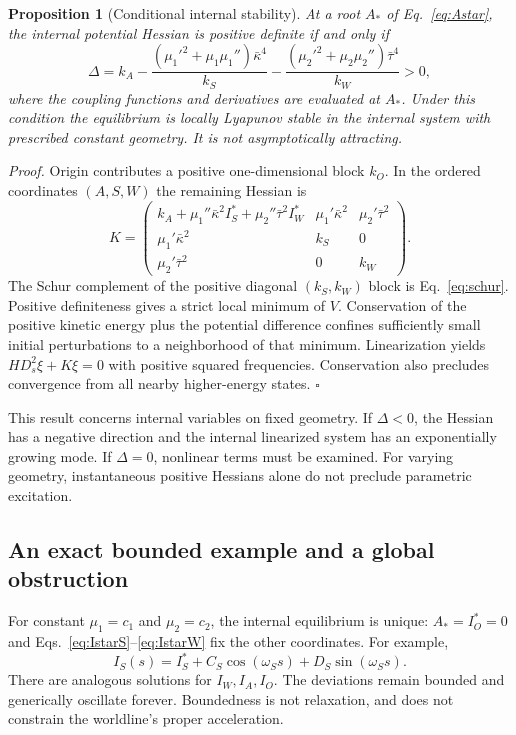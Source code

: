 \documentclass[aip,jmp,reprint,onecolumn,amsmath,amssymb]{revtex4-2}
\newcommand{\Ds}{D_s}
\newtheorem{proposition}{Proposition}
\begin{document}
\begin{proposition}[Conditional internal stability]
At a root $A_*$ of Eq.~\eqref{eq:Astar}, the internal potential Hessian is positive definite if and only if
\begin{equation}
 \Delta=k_A-
 \frac{(\mu_1'^2+\mu_1\mu_1'')\bar\kappa^4}{k_S}
 -\frac{(\mu_2'^2+\mu_2\mu_2'')\bar\tau^4}{k_W}>0,
 \label{eq:schur}
\end{equation}
where the coupling functions and derivatives are evaluated at $A_*$. Under this condition the equilibrium is locally Lyapunov stable in the internal system with prescribed constant geometry. It is not asymptotically attracting.
\end{proposition}
\textit{Proof.} Origin contributes a positive one-dimensional block $k_O$. In the ordered coordinates $(A,S,W)$ the remaining Hessian is
\begin{equation}
 K=\begin{pmatrix}
 k_A+\mu_1''\bar\kappa^2I_S^*+\mu_2''\bar\tau^2I_W^*&\mu_1'\bar\kappa^2&\mu_2'\bar\tau^2\\
 \mu_1'\bar\kappa^2&k_S&0\\
 \mu_2'\bar\tau^2&0&k_W
 \end{pmatrix}.
\end{equation}
The Schur complement of the positive diagonal $(k_S,k_W)$ block is Eq.~\eqref{eq:schur}. Positive definiteness gives a strict local minimum of $V$. Conservation of the positive kinetic energy plus the potential difference confines sufficiently small initial perturbations to a neighborhood of that minimum. Linearization yields $H\Ds^2\xi+K\xi=0$ with positive squared frequencies. Conservation also precludes convergence from all nearby higher-energy states. $\square$

This result concerns internal variables on fixed geometry. If $\Delta<0$, the Hessian has a negative direction and the internal linearized system has an exponentially growing mode. If $\Delta=0$, nonlinear terms must be examined. For varying geometry, instantaneous positive Hessians alone do not preclude parametric excitation.

\subsection{An exact bounded example and a global obstruction}
For constant $\mu_1=c_1$ and $\mu_2=c_2$, the internal equilibrium is unique: $A_*=I_O^*=0$ and Eqs.~\eqref{eq:IstarS}--\eqref{eq:IstarW} fix the other coordinates. For example,
\begin{equation}
 I_S(s)=I_S^*+C_S\cos(\omega_Ss)+D_S\sin(\omega_Ss).
 \label{eq:forced}
\end{equation}
There are analogous solutions for $I_W,I_A,I_O$. The deviations remain bounded and generically oscillate forever. Boundedness is not relaxation, and does not constrain the worldline's proper acceleration.
\end{document}
